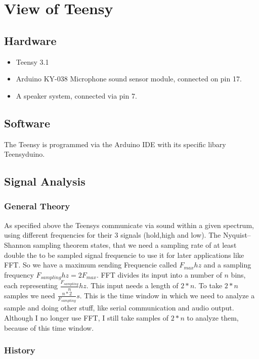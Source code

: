 \documentclass{book}
\begin{document}
\chapter{View of Teensy}
\section{Hardware}
\begin{itemize}
\item Teensy 3.1
\item Arduino KY-038 Microphone sound sensor module, connected on pin 17.
\item A speaker system, connected via pin 7.
\end{itemize}

\section{Software}
The Teensy is programmed via the Arduino IDE with its specific libary Teensyduino.


\section{Signal Analysis}
\subsection{General Theory}
As specified above the Teensys communicate via sound within a given spectrum, using different frequencies for their 3 signals (hold,high and low). The Nyquist–Shannon sampling theorem states, that we need a sampling rate of at least double the to be sampled signal frequencie to use it for later applications like FFT. So we have a maximum sending Frequencie called $F_{max}hz$ and a sampling frequency $F_{sampling}hz=2F_{max}$. FFT divides its input into a number of $n$ bins, each representing $\frac{F_{sampling}}{n}hz$. This input needs a length of $2*n$. To take $2*n$ samples we need $\frac{n*2}{F_{sampling}}s$. This is the time window in which we need to analyze a sample and doing other stuff, like serial communication and audio output. Although I no longer use FFT, I still take samples of $2*n$ to analyze them, because of this time window.

\subsection{History}
\end{document}

